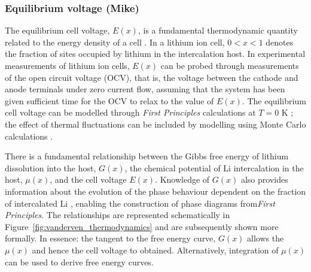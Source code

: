 \documentclass[journal=jacsat,manuscript=article]{achemso}
\begin{document}
\subsubsection{Equilibrium voltage (Mike)}
\label{sec:properties_equilibriumvoltage}
The equilibrium cell voltage, $E(x)$, is a fundamental thermodynamic quantity related to the energy density of a cell \cite{urban_computational_2016,CEDER1999131,VanderVen2020}. In a lithium ion cell, $0 < x < 1$ denotes the fraction of sites occupied by lithium in the intercalation host. In experimental measurements of lithium ion cells, $E(x)$ can be probed through measurements of the open circuit voltage (OCV), that is, the voltage between the cathode and anode terminals under zero current flow, assuming that the system has been given sufficient time for the OCV to relax to the value of $E(x)$. The equilibrium cell voltage can be modelled through \textit{First Principles} calculations at $T = 0$ K \cite{urban_computational_2016,CEDER1999131,VanderVen2020}; the effect of thermal fluctuations can be included by modelling using Monte Carlo calculations \cite{mercer_influence_2017,Kim2001h}.

There is a fundamental relationship between the Gibbs free energy of lithium dissolution into the host, $G(x)$, the chemical potential of Li intercalation in the host, $\mu(x)$, and the cell voltage $E(x)$. Knowledge of $G(x)$ also provides information about the evolution of the phase behaviour dependent on the fraction of intercalated Li \cite{CEDER1999131,persson2010,VanderVen2020,VanDerVen2000b}, enabling the construction of phase diagrams from\textit{First Principles}. The relationships are represented schematically in Figure~\ref{fig:vanderven_thermodynamics} and are subsequently shown more formally. In essence: the tangent to the free energy curve, $G(x)$ allows the $\mu(x)$ and hence the cell voltage to obtained. Alternatively, integration of $\mu(x)$ can be used to derive free energy curves. 
\end{document}
